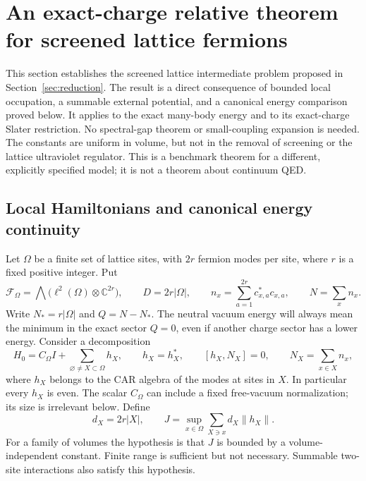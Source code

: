 \section{An exact-charge relative theorem for screened lattice fermions}
\label{sl-sec}

This section establishes the screened lattice intermediate problem proposed
in Section~\ref{sec:reduction}. The result is a direct consequence of
bounded local occupation, a summable external potential, and a canonical
energy comparison proved below. It applies to the exact many-body energy
and to its exact-charge Slater restriction. No spectral-gap theorem or
small-coupling expansion is needed. The constants are uniform in volume,
but not in the removal of screening or the lattice ultraviolet regulator.
This is a benchmark theorem for a different, explicitly specified model;
it is not a theorem about continuum QED.

\subsection{Local Hamiltonians and canonical energy continuity}
\label{sl-local}

Let \(\Omega\) be a finite set of lattice sites, with \(2r\) fermion modes
per site, where \(r\) is a fixed positive integer. Put
\[
\mathcal F_\Omega=\bigwedge\bigl(\ell^2(\Omega)\otimes\mathbb C^{2r}\bigr),
\qquad D=2r|\Omega|,
\qquad n_x=\sum_{a=1}^{2r}c_{x,a}^*c_{x,a},
\qquad N=\sum_xn_x.
\]
Write \(N_* = r|\Omega|\) and \(Q=N-N_*\). The neutral vacuum energy will
always mean the minimum in the exact sector \(Q=0\), even if another
charge sector has a lower energy. Consider a decomposition
\begin{equation}
H_0=C_\Omega I+\sum_{\varnothing\ne X\subset\Omega}h_X,
\qquad h_X=h_X^*,\qquad [h_X,N_X]=0,
\qquad N_X=\sum_{x\in X}n_x,
\label{sl-local-h}
\end{equation}
where \(h_X\) belongs to the CAR algebra of the modes at sites in \(X\).
In particular every \(h_X\) is even. The scalar \(C_\Omega\) can include a
fixed free-vacuum normalization; its size is irrelevant below. Define
\begin{equation}
d_X=2r|X|,
\qquad
J=\sup_{x\in\Omega}\sum_{X\ni x}d_X\|h_X\|.
\label{sl-J}
\end{equation}
For a family of volumes the hypothesis is that \(J\) is bounded by a
volume-independent constant. Finite range is sufficient but not
necessary. Summable two-site interactions also satisfy this hypothesis.

